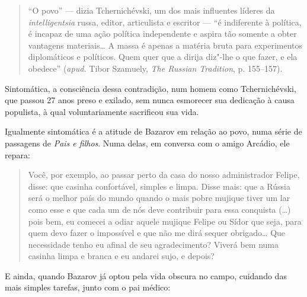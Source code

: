 \begin{quote}
``O povo'' --- dizia Tchernichévski, um dos
mais influentes líderes da \emph{intelligentsia} russa, editor,
articulista e escritor --- ``é indiferente à política, é incapaz de uma
ação política independente e aspira tão somente a obter vantagens
materiais\ldots{} A massa é apenas a matéria bruta para experimentos diplomáticos e
políticos. Quem quer que a dirija diz"-lhe o que fazer, e ela obedece'' (\emph{apud.} Tibor Szamuely, \emph{The Russian Tradition}, p. 155--157).
\end{quote}

Sintomática, a consciência dessa contradição, num homem como
Tchernichévski, que passou 27 anos preso e exilado, sem nunca esmorecer
sua dedicação à causa populista, à qual voluntariamente sacrificou sua
vida.

Igualmente sintomática é a atitude de Bazarov em relação ao povo, numa
série de passagens de \emph{Pais e filhos}. Numa delas, em conversa com o amigo Arcádio, ele
repara:

\begin{quote}
Você, por exemplo, ao passar perto da casa do nosso administrador
Felipe, disse: que casinha confortável, simples e limpa. Disse mais: que
a Rússia será o melhor país do mundo quando o mais pobre mujique tiver
um lar como esse e que cada um de nós deve contribuir para essa
conquista (\ldots{}) pois bem, eu comecei a odiar aquele mujique Felipe ou
Sídor que seja, para quem devo fazer o impossível e que não me dirá
sequer obrigado\ldots{} Que necessidade tenho eu afinal de seu
agradecimento? Viverá bem numa casinha limpa e branca e eu andarei sujo,
e depois?
\end{quote}

E ainda, quando Bazarov já optou pela vida obscura no campo, cuidando
das mais simples tarefas, junto com o pai médico:

